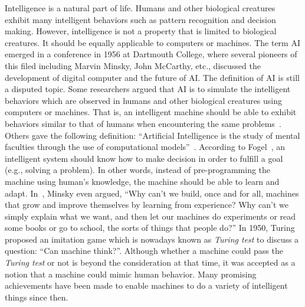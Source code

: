 Intelligence is a natural part of life. Humans and other biological creatures exhibit many intelligent behaviors such as pattern recognition and decision making. However, intelligence is not a property that is limited to biological creatures. It should be equally applicable to computers or machines. The term AI emerged in a conference in 1956 at Dartmouth College, where several pioneers of this filed including Marvin Minsky, John McCarthy, etc., discussed the development of digital computer and the future of AI. The definition of AI is still a disputed topic.  Some researchers argued that AI is to simulate the intelligent behaviors which are observed in humans and other biological creatures using computers or machines. That is, an intelligent machine should be able to exhibit behaviors similar to that of humans when encountering the same problems~\cite{Schildt1985}. Others gave the following definition: ``Artificial Intelligence is the study of mental faculties through the use of computational models''~\cite{Charniak1985}. According to Fogel~\cite{Fogel1995}, an intelligent system should know how to make decision in order to fulfill a goal (e.g., solving a problem). In other words, instead of pre-programming the machine using human's knowledge, the machine should be able to learn and adapt. In~\cite{Minsky_1991}, Minsky even argued, ``Why can't we build, once and for all, machines that grow and improve themselves by learning from experience? Why can't we simply explain what we want, and then let our machines do experiments or read some books or go to school, the sorts of things that people do?'' In 1950, Turing~\cite{Turing_1950} proposed an imitation game which is nowadays known as \textit{Turing test} to discuss a question: ``Can machine think?''. Although whether a machine could pass the \textit{Turing test} or not is beyond the consideration at that time, it was accepted as a notion that a machine could mimic human behavior. Many promising achievements have been made to enable machines to do a variety of intelligent things since then. 

